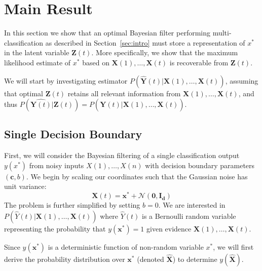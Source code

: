 \documentclass[12pt]{article}
\begin{document}
\section{Main Result}

In this section we show that an optimal Bayesian filter performing multi-classification as described in Section~\ref{sec:intro} must store a representation of $x^*$ in the latent variable $\mathbf Z(t)$. 
More specifically, we show that the maximum likelihood estimate of $x^*$ based on $\mathbf X(1), \dots, \mathbf X(t)$ is recoverable from $\mathbf Z(t)$.

We will start by investigating estimator $P(\hat{\mathbf Y}(t) | \mathbf X(1), \dots, \mathbf X(t))$, assuming that optimal $\mathbf Z(t)$ retains all relevant information from $\mathbf X(1), \dots, \mathbf X(t)$, and thus $P(\hat{\mathbf Y(t)} | \mathbf Z(t)) = P(\hat{\mathbf Y(t)} | \mathbf X(1), \dots, \mathbf X(t))$. 


\subsection{Single Decision Boundary}
\label{sec:single_boundary}

First, we will consider the Bayesian filtering of a single classification output $y(x^*)$ from noisy inputs $X(1), \dots, X(n)$ with decision boundary parameters $(\mathbf c, b)$. 
We begin by scaling our coordinates such that the Gaussian noise has unit variance:
\begin{equation}
	\mathbf X(t) = \mathbf x^* + \mathcal N(\mathbf{0, I_d})
\end{equation}
The problem is further simplified by setting $b = 0$. 
We are interested in $P(\hat Y(t) | \mathbf X(1), \dots, \mathbf X(t))$ where $\hat Y(t)$ is a Bernoulli random variable representing the probability that $y(\mathbf x^*) = 1$ given evidence $\mathbf X(1), \dots, \mathbf X(t)$. 

Since $y(\mathbf x^*)$ is a deterministic function of non-random variable $x^*$, we will first derive the probability distribution over $\mathbf x^*$ (denoted $\hat{\mathbf X}$) to determine $y(\hat{\mathbf X})$. 
\end{document}
